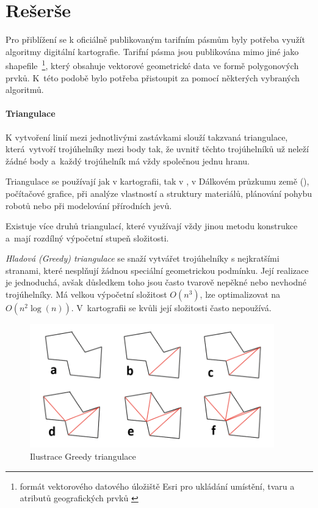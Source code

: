 \chapter{Rešerše}
\label{0-reserse}

Pro přiblížení se k oficiálně publikovaným tarifním pásmům byly
potřeba využít algoritmy digitální kartografie. Tarifní pásma jsou
publikována mimo jiné jako shapefile~\footnote{formát vektorového
  datového úložiště Esri pro ukládání umístění, tvaru a atributů
  geografic\-kých prvků \cite{shapefile}}, který obsahuje vektorové
geometrické data ve formě polygonových prvků. K~této podobě bylo
potřeba přistoupit za pomocí některých vybraných algoritmů.

\subsubsection{Triangulace}
\label{triangulace}

K vytvoření linií mezi jednotlivými zastávkami slouží takzvaná triangulace, 
která~vy\-tvoří troj\-úhelníky mezi body tak, že uvnitř těchto trojúhelníků  
už neleží žádné body a~každý trojúhelník má vždy společnou jednu hranu. 

Triangulace se používají jak v kartografii, tak v , v Dálkovém průzkumu země (),
počítačové grafice, při analýze vlastností a struktury materiálů, plánování pohybu robotů
nebo při modelování přírodních jevů. \cite{bayer-delaunay}

Existuje více druhů triangulací, které využívají vždy jinou metodu konstrukce a~mají 
rozdílný výpočetní stupeň složitosti. 

\textit{Hladová (Greedy) triangulace} se snaží vytvářet trojúhelníky s nejkratšími strana\-mi,
které nesplňují žádnou speciální geometrickou podmínku. Její realizace je jedno\-duchá,
avšak důsledkem toho jsou často tvarově nepěkné nebo nevhodné trojúhelníky. Má velkou výpočetní
složitost \(O(n^3)\), lze optimalizovat na \(O(n^2 \log(n))\). V~kartografii se
kvůli její složitosti často nepoužívá. \cite{vanicek}

\begin{figure}[H] \centering
    \includegraphics[width=300pt]{./pictures/triangulace-greedy.png}
    \caption[Ilustrace Greedy triangulace]{Ilustrace Greedy triangulace \cite{triangulace-greedy}}
	\label{fig:triangulace-greedy}              
\end{figure}

